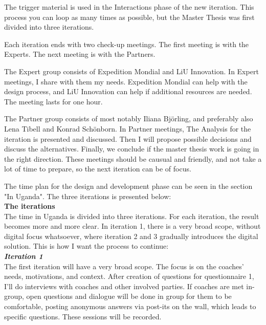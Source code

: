 The trigger material is used in the Interactions phase of the new iteration. This process you can loop as many times as possible, but the Master Thesis was first divided into three iterations.

Each iteration ends with two check-up meetings. The first meeting is with the Experts. The next meeting is with the Partners.

The Expert group consists of Expedition Mondial and LiU Innovation. In Expert meetings, I share with them my needs. Expedition Mondial can help with the design process, and LiU Innovation can help if additional resources are needed. The meeting lasts for one hour.

The Partner group consists of most notably Iliana Björling, and preferably also Lena Tibell and Konrad Schönborn. In Partner meetings, The Analysis for the iteration is presented and discussed. Then I will propose possible decisions and discuss the alternatives. %
Finally, we conclude if the master thesis work is going in the right direction. These meetings should be causual and friendly, and not take a lot of time to prepare, so the next iteration can be of focus. %

The time plan for the design and development phase can be seen in the section "In Uganda". The three iterations is presented below: \\

\textbf{The iterations} \\
The time in Uganda is divided into three iterations. For each iteration, the result becomes more and more clear. In iteration 1, there is a very broad scope, without digital focus whatsoever, where iteration 2 and 3 gradually introduces the digital solution. This is how I want the process to continue:\\

	\textit{\textbf{Iteration 1}}\\
    The first iteration will have a very broad scope. The focus is on the coaches' needs, motivations, and context.  After creation of questions for questionnaire 1, I'll do interviews with coaches and other involved parties. If coaches are met in-group, open questions and dialogue will be done in group for them to be comfortable, posting anonymous answers via post-its on the wall, which leads to specific questions. These sessions will be recorded.

